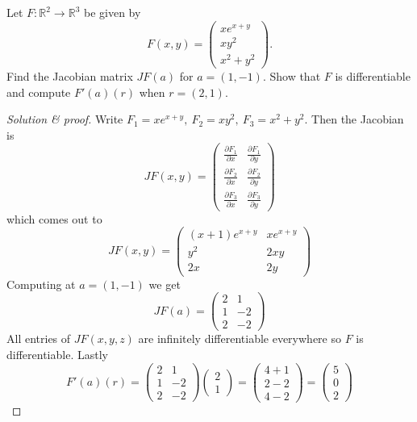 \begin{prob}
    Let $F : \mathbb R^2 \to \mathbb R^3$ be given by 
    \[
        F(x,y) = 
        \begin{pmatrix}
            xe^{x+y} \\ 
            xy^2 \\ 
            x^2 + y^2
        \end{pmatrix}.
    \]
    Find the Jacobian matrix $JF(a)$ for $a = (1,-1)$. Show that 
    $F$ is differentiable and compute $F'(a)(r)$ when 
    $r = (2,1)$.
\end{prob}
\begin{proof}[Solution \& proof]
    Write $F_1 = xe^{x+y}, \ F_2 = xy^2, \ F_3 = x^2 + y^2$.
    Then the Jacobian is 
    \[
        JF(x,y) 
        = 
        \begin{pmatrix}
            \frac{\partial F_1}{\partial x} &
            \frac{\partial F_1}{\partial y} \\[4pt]
            \frac{\partial F_2}{\partial x} &
            \frac{\partial F_2}{\partial y} \\[4pt]
            \frac{\partial F_3}{\partial x} &
            \frac{\partial F_3}{\partial y} 
        \end{pmatrix}
    \]
    which comes out to 
    \[
        JF(x,y) 
        = 
        \begin{pmatrix}
            (x+1)e^{x+y} & xe^{x+y} \\
            y^2 & 2xy \\ 
            2x & 2y
        \end{pmatrix}
    \]
    Computing at $a = (1,-1)$ we get 
    \[
        JF(a) 
        = 
        \begin{pmatrix}
            2 & 1 \\ 
            1 & -2 \\ 
            2 & -2
        \end{pmatrix}
    \]
    All entries of $JF(x,y,z)$ are infinitely differentiable 
    everywhere so $F$ is differentiable. 
    Lastly 
    \[
        F'(a)(r) 
        = 
        \begin{pmatrix}
            2 & 1 \\ 
            1 & -2 \\ 
            2 & -2
        \end{pmatrix}
        \begin{pmatrix}
            2 \\ 1
        \end{pmatrix}
        = 
        \begin{pmatrix}
            4 + 1 \\ 
            2 - 2 \\ 
            4 - 2 
        \end{pmatrix}
        = 
        \begin{pmatrix}
            5 \\ 0 \\ 2
        \end{pmatrix}
    \]
\end{proof}
